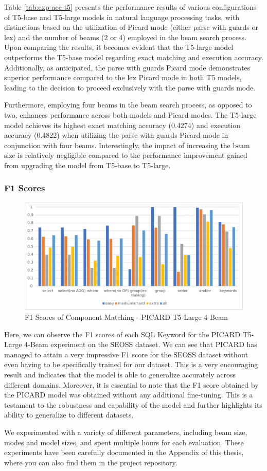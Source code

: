 Table \ref{tab:exp-acc-t5} presents the performance results of various configurations of T5-base and T5-large models in natural language processing tasks, with distinctions based on the utilization of Picard mode (either parse with guards or lex) and the number of beams (2 or 4) employed in the beam search process. Upon comparing the results, it becomes evident that the T5-large model outperforms the T5-base model regarding exact matching and execution accuracy. Additionally, as anticipated, the parse with guards Picard mode demonstrates superior performance compared to the lex Picard mode in both T5 models, leading to the decision to proceed exclusively with the parse with guards mode.

Furthermore, employing four beams in the beam search process, as opposed to two, enhances performance across both models and Picard modes. The T5-large model achieves its highest exact matching accuracy (0.4274) and execution accuracy (0.4822) when utilizing the parse with guards Picard mode in conjunction with four beams. Interestingly, the impact of increasing the beam size is relatively negligible compared to the performance improvement gained from upgrading the model from T5-base to T5-large.

\subsubsection*{F1 Scores}

\begin{figure}[H]
    \centering
    \includegraphics[width=1\textwidth]{pics/ez/F1eps}
    \caption{F1 Scores of Component Matching - PICARD T5-Large 4-Beam}
\end{figure}

Here, we can observe the F1 scores of each SQL Keyword for the PICARD T5-Large 4-Beam experiment on the SEOSS dataset. We can see that PICARD has managed to attain a very impressive F1 score for the SEOSS dataset without even having to be specifically trained for our dataset. This is a very encouraging result and indicates that the model is able to generalize accurately across different domains. Moreover, it is essential to note that the F1 score obtained by the PICARD model was obtained without any additional fine-tuning. This is a testament to the robustness and capability of the model and further highlights its ability to generalize to different datasets.

We experimented with a variety of different parameters, including beam size, modes and model sizes, and spent multiple hours for each evaluation. These experiments have been carefully documented in the Appendix of this thesis, where you can also find them in the project repository.
